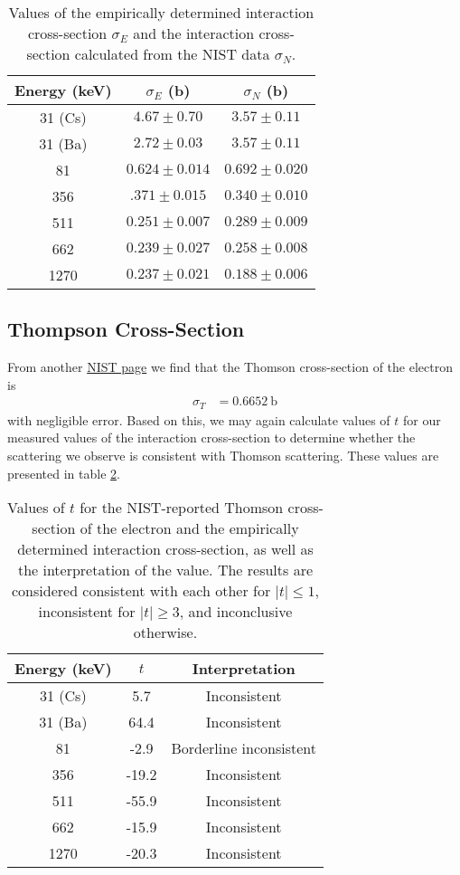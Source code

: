 \documentclass[letter]{article}
\begin{document}
\begin{table}[h] 
\centering  \begin{tabular}{ c  c   c  } 
Energy (\unit{\kilo\electronvolt}) & $\sigma_E$ (\unit{\barn}) & $\sigma_N$ (\unit{\barn}) \\ \hline
31 (Cs) & $\num{4.67} \pm \num{0.70}$ & $\num{3.57} \pm \num{0.11}$ \\ 
31 (Ba) &$ \num{2.72}\pm\num{0.03} $&$ \num{3.57}\pm\num{0.11}$ \\
81 &  $\num{0.624}\pm\num{0.014}$ & $\num{0.692}\pm\num{0.020}$ \\
356 & $\num{.371}\pm\num{0.015}$ & $\num{0.340}\pm\num{0.010}$ \\
511 & $\num{0.251}\pm 0.007$ & $0.289 \pm 0.009 $\\
662 &  $0.239 \pm 0.027$ & $0.258 \pm 0.008 $\\
1270 &  $0.237 \pm 0.021$ &$ 0.188 \pm 0.006$
\end{tabular}
\caption{Values of the empirically determined interaction cross-section $\sigma_E$ and the interaction cross-section calculated from the NIST data $\sigma_N$.}
\label{tab:XSections}
\end{table}

\subsection{Thompson Cross-Section}

From another \href{https://physics.nist.gov/cgi-bin/cuu/Value?sigmae}{NIST page} we find that the Thomson cross-section of the electron is 
\begin{align}
\sigma_T &= \qty{0.6652}{\barn}
\end{align}
with negligible error. Based on this, we may again calculate values of $t$ for our measured values of the interaction cross-section to determine whether the scattering we observe is consistent with Thomson scattering. These values are presented in table \ref{tab:tSigma}.

\begin{table}[h] 
\centering  \begin{tabular}{ c  c   c } 
Energy (\unit{\kilo\electronvolt}) & $t$ & Interpretation \\ \hline
31 (Cs) & 5.7 & Inconsistent \\ 
31 (Ba) & 64.4 & Inconsistent \\
81 &  -2.9 & Borderline inconsistent\\
356 & -19.2 & Inconsistent\\
511 &  -55.9 & Inconsistent\\
662 & -15.9 & Inconsistent \\
1270 &  -20.3 & Inconsistent
\end{tabular}
\caption{Values of $t$ for the NIST-reported Thomson cross-section of the electron and the empirically determined interaction cross-section, as well as the interpretation of the value. The results are considered consistent with each other for $|t| \leq 1$, inconsistent for $|t|\geq3$, and inconclusive otherwise. }
\label{tab:tSigma}
\end{table}
\end{document}
